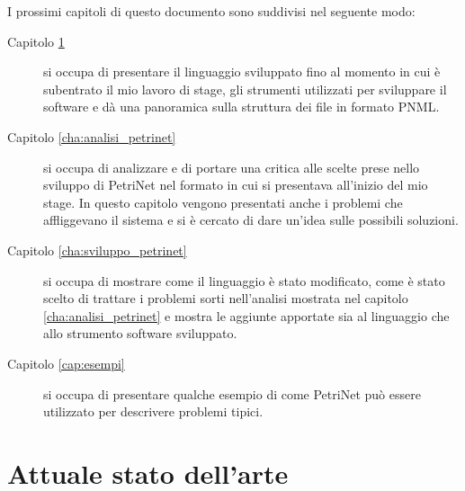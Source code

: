 \documentclass[italian,12pt]{book}
\begin{document}
 I prossimi capitoli di questo documento sono suddivisi nel seguente modo:
 \begin{description}
 \item[Capitolo \ref{cha:stato_arte}] si occupa di presentare il linguaggio sviluppato fino al momento
 in cui è subentrato il mio lavoro di stage, gli strumenti utilizzati per sviluppare il software e dà una 
 panoramica sulla struttura dei file in formato PNML.
 \item[Capitolo \ref{cha:analisi_petrinet}] si occupa di analizzare e di portare una critica alle scelte 
 prese nello sviluppo di PetriNet nel formato in cui si presentava all'inizio del mio stage. In questo 
 capitolo vengono presentati anche i problemi che affliggevano il sistema e si è cercato di dare un'idea 
 sulle possibili soluzioni.
 \item[Capitolo \ref{cha:sviluppo_petrinet}] si occupa di mostrare come il linguaggio è stato modificato,
 come è stato scelto di trattare i problemi sorti nell'analisi mostrata nel capitolo \ref{cha:analisi_petrinet} 
 e mostra le aggiunte apportate sia al linguaggio che allo strumento software sviluppato.
 \item[Capitolo \ref{cap:esempi}] si occupa di presentare qualche esempio di come PetriNet 
 può essere utilizzato per descrivere problemi tipici.
 \end{description}
\chapter{Attuale stato dell'arte}\label{cha:stato_arte}
%
\end{document}
